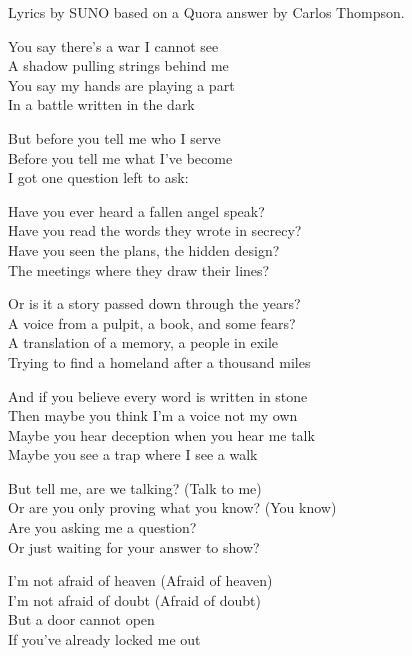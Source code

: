 
\begin{notes}
Lyrics by SUNO based on a Quora answer by Carlos Thompson.
\end{notes}
\begin{lyrics}

You say there’s a war I cannot see\\
A shadow pulling strings behind me\\
You say my hands are playing a part\\
In a battle written in the dark

But before you tell me who I serve\\
Before you tell me what I’ve become\\
I got one question left to ask:


Have you ever heard a fallen angel speak?\\
Have you read the words they wrote in secrecy?\\
Have you seen the plans, the hidden design?\\
The meetings where they draw their lines?

Or is it a story passed down through the years?\\
A voice from a pulpit, a book, and some fears?\\
A translation of a memory, a people in exile\\
Trying to find a homeland after a thousand miles


And if you believe every word is written in stone\\
Then maybe you think I’m a voice not my own\\
Maybe you hear deception when you hear me talk\\
Maybe you see a trap where I see a walk


But tell me, are we talking? (Talk to me)\\
Or are you only proving what you know? (You know)\\
Are you asking me a question?\\
Or just waiting for your answer to show?

I’m not afraid of heaven (Afraid of heaven)\\
I’m not afraid of doubt (Afraid of doubt)\\
But a door cannot open\\
If you’ve already locked me out


\end{lyrics}
